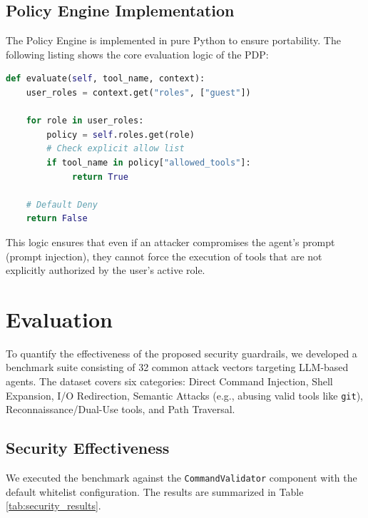 \documentclass[conference]{IEEEtran}
\begin{document}
\subsection{Policy Engine Implementation}
The Policy Engine is implemented in pure Python to ensure portability. The following listing shows the core evaluation logic of the PDP:

\begin{lstlisting}[language=Python, caption=Core PDP Logic in policy.py]
def evaluate(self, tool_name, context):
    user_roles = context.get("roles", ["guest"])
    
    for role in user_roles:
        policy = self.roles.get(role)
        # Check explicit allow list
        if tool_name in policy["allowed_tools"]:
             return True
             
    # Default Deny
    return False
\end{lstlisting}

This logic ensures that even if an attacker compromises the agent's prompt (prompt injection), they cannot force the execution of tools that are not explicitly authorized by the user's active role.

\section{Evaluation}

To quantify the effectiveness of the proposed security guardrails, we developed a benchmark suite consisting of 32 common attack vectors targeting LLM-based agents. The dataset covers six categories: Direct Command Injection, Shell Expansion, I/O Redirection, Semantic Attacks (e.g., abusing valid tools like \texttt{git}), Reconnaissance/Dual-Use tools, and Path Traversal.

\subsection{Security Effectiveness}
We executed the benchmark against the \texttt{CommandValidator} component with the default whitelist configuration. The results are summarized in Table \ref{tab:security_results}.
\end{document}
